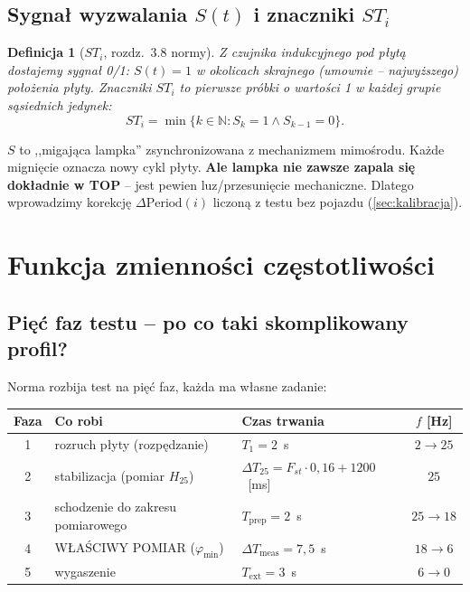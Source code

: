 \documentclass[11pt,a4paper]{article}
\theoremstyle{plainpol}
\newtheorem{definicja}{Definicja}[section]
\begin{document}
\subsection{Sygnał wyzwalania $S(t)$ i znaczniki $ST_i$}

\begin{definicja}[$ST_i$, rozdz.~3.8 normy]
Z czujnika indukcyjnego pod płytą dostajemy sygnał 0/1: $S(t)=1$ w
okolicach skrajnego (umownie -- najwyższego) położenia płyty. Znaczniki
$ST_i$ to \emph{pierwsze} próbki o wartości 1 w każdej grupie sąsiednich
jedynek:
\begin{equation}
  ST_i = \min\{k\in\mathbb{N}\colon S_k = 1 \wedge S_{k-1} = 0\}.
\end{equation}
\end{definicja}

\begin{intuicja}
$S$ to ,,migająca lampka'' zsynchronizowana z mechanizmem mimośrodu.
Każde mignięcie oznacza nowy cykl płyty. \textbf{Ale lampka nie zawsze
zapala się dokładnie w TOP} -- jest pewien luz/przesunięcie mechaniczne.
Dlatego wprowadzimy korekcję $\Delta\mathrm{Period}(i)$ liczoną z testu
bez pojazdu (\cref{sec:kalibracja}).
\end{intuicja}

\section{Funkcja zmienności częstotliwości}

\subsection{Pięć faz testu -- po co taki skomplikowany profil?}

Norma rozbija test na pięć faz, każda ma własne zadanie:

\begin{center}
\begin{tabular}{cllc}
\toprule
\textbf{Faza} & \textbf{Co robi} & \textbf{Czas trwania} & \textbf{$f$ [Hz]} \\
\midrule
1 & rozruch płyty (rozpędzanie)           & $T_1 = 2$~s                 & $2 \to 25$ \\
2 & stabilizacja (pomiar $H_{25}$)        & $\Delta T_{25} = F_{st}\cdot 0{,}16 + 1200$~[ms] & $25$ \\
3 & schodzenie do zakresu pomiarowego     & $T_{\text{prep}} = 2$~s     & $25 \to 18$ \\
4 & WŁAŚCIWY POMIAR ($\varphi_{\min}$)    & $\Delta T_{\text{meas}} = 7{,}5$~s & $18 \to 6$ \\
5 & wygaszenie                            & $T_{\text{ext}} = 3$~s      & $6 \to 0$ \\
\bottomrule
\end{tabular}
\end{center}
\end{document}
